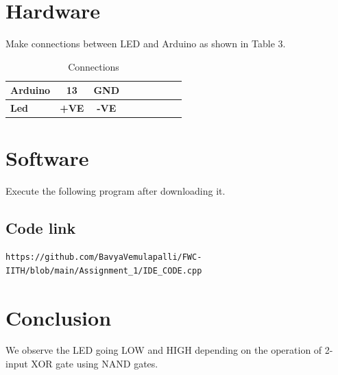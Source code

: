 \documentclass[10pt, a4paper]{article}
\begin{document}
\section{Hardware}

Make connections between LED and Arduino as shown in Table 3.

\begin{table}[H]
 \begin{center}
    \begin{tabular}{|l|c|c|c|c|c|c|c|c} \hline\textbf{Arduino} & \textbf{13} & \textbf{GND} \\ \hline
 \textbf{Led} & \textbf{+VE} & \textbf{-VE}\\ \hline
\end{tabular}   
\end{center}
\caption{Connections}
\label{table 3}
\end{table}


\section{Software}

Execute the following program after downloading it.

\subsection{Code link}
\vspace{5mm}
\begin{lstlisting}
https://github.com/BavyaVemulapalli/FWC-IITH/blob/main/Assignment_1/IDE_CODE.cpp
\end{lstlisting}

\section{Conclusion}
We observe the LED going LOW and HIGH depending on the operation of 2-input XOR gate using NAND gates.
\end{document}
